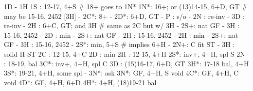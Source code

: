 1D - 1H
1S : 12-17, 4+S  # 18+ goes to 1N*
1N*: 16+; or (13)14-15, 6+D, GT  # may be 15-16, 2452 [3H]
   - 2C*: 8+
        - 2D*: 6+D, GT
                - P  : s/o
                - 2N : re-inv
                - 3D : re-inv
        - 2H : 6+C, GT; and 3H  # same as 2C but w/ 3H
        - 2S+: nat GF
        - 3H : 15-16, 2452
   - 2D : min
        - 2S+: nat GF
        - 2H : 15-16, 2452
   - 2H : min
        - 2S+: nat GF
        - 3H : 15-16, 2452
   - 2S*: min, 5+S  # implies 6+H
   - 2N+: C fit ST
   - 3H : solid H ST
2C : 12-15, 4+C
2D : min
2H : 12-15, 4+H
2S*: inv+, 4+H, spl S
2N : 18-19, bal
3C*: inv+, 4+H, spl C
3D : (15)16-17, 6+D, GT
3H*: 17-18 bal, 4+H
3S*: 19-21, 4+H, some spl
   - 3N*: ask
3N*: GF, 4+H, S void 
4C*: GF, 4+H, C void
4D*: GF, 4+H, 6+D
4H*: 4+H, (18)19-21 bal

